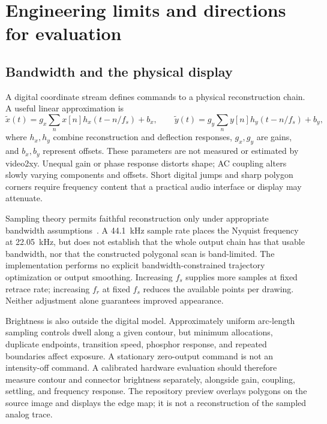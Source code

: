 \documentclass[11pt,a4paper]{article}
\begin{document}
\FloatBarrier

\section{Engineering limits and directions for evaluation}
\subsection{Bandwidth and the physical display}
A digital coordinate stream defines commands to a physical reconstruction chain. A useful linear approximation is
\begin{equation}
 \widetilde x(t)=g_x\sum_n x[n]h_x(t-n/f_s)+b_x,\qquad
 \widetilde y(t)=g_y\sum_n y[n]h_y(t-n/f_s)+b_y,
 \label{eq:hardware}
\end{equation}
where $h_x,h_y$ combine reconstruction and deflection responses, $g_x,g_y$ are gains, and $b_x,b_y$ represent offsets. These parameters are not measured or estimated by video2xy. Unequal gain or phase response distorts shape; AC coupling alters slowly varying components and offsets. Short digital jumps and sharp polygon corners require frequency content that a practical audio interface or display may attenuate.

Sampling theory permits faithful reconstruction only under appropriate bandwidth assumptions~\cite{shannon}. A 44.1~kHz sample rate places the Nyquist frequency at 22.05~kHz, but does not establish that the whole output chain has that usable bandwidth, nor that the constructed polygonal scan is band-limited. The implementation performs no explicit bandwidth-constrained trajectory optimization or output smoothing. Increasing $f_s$ supplies more samples at fixed retrace rate; increasing $f_r$ at fixed $f_s$ reduces the available points per drawing. Neither adjustment alone guarantees improved appearance.

Brightness is also outside the digital model. Approximately uniform arc-length sampling controls dwell along a given contour, but minimum allocations, duplicate endpoints, transition speed, phosphor response, and repeated boundaries affect exposure. A stationary zero-output command is not an intensity-off command. A calibrated hardware evaluation should therefore measure contour and connector brightness separately, alongside gain, coupling, settling, and frequency response. The repository preview overlays polygons on the source image and displays the edge map; it is not a reconstruction of the sampled analog trace.
\end{document}
